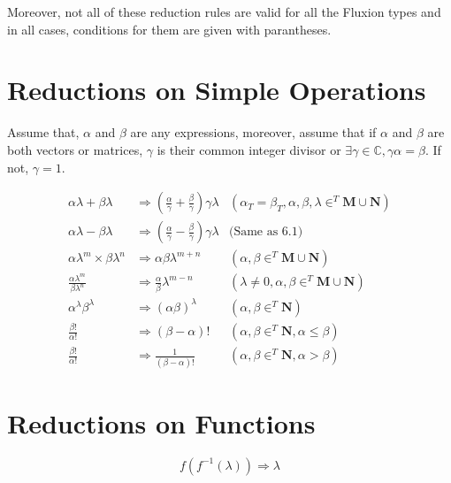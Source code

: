 \documentclass[11pt,a4paper]{book}
\begin{document}
Moreover, not all of these reduction rules are valid for all the Fluxion types and in all cases, conditions for them are given with parantheses.

\section{Reductions on Simple Operations}

Assume that, $\alpha$ and $\beta$ are any expressions, moreover, assume that if $\alpha$ and $\beta$ are both vectors or matrices, $\gamma$ is their common integer divisor or $\exists \gamma \in \mathbb{C}, \gamma\alpha = \beta$. If not, $\gamma = 1$.


\begin{align}
\alpha\lambda + \beta\lambda &\Rightarrow \left( \frac{\alpha}{\gamma} + \frac{\beta}{\gamma}\right)\gamma\lambda & \left( \alpha_T = \beta_T, \alpha, \beta, \lambda \in^T \mathbf{M} \cup \mathbf{N} \right)\\
\alpha\lambda - \beta\lambda &\Rightarrow \left( \frac{\alpha}{\gamma} - \frac{\beta}{\gamma}\right) \gamma\lambda & \text{(Same as 6.1)}\\
\alpha\lambda^m \times \beta\lambda^n &\Rightarrow  \alpha\beta\lambda^{m + n} & \left( \alpha, \beta \in^T \mathbf{M} \cup \mathbf{N} \right)\\
\frac{\alpha\lambda^{m}}{\beta\lambda^{n}} &\Rightarrow \frac{ \alpha}{\beta}\lambda^{m - n} & \left(\lambda \neq 0, \alpha, \beta \in^T \mathbf{M} \cup \mathbf{N} \right)\\
\alpha^{\lambda}\beta^{\lambda} &\Rightarrow \left(\alpha\beta\right)^\lambda & \left( \alpha, \beta \in^T \mathbf{N} \right)\\
\frac{\beta!}{\alpha!} &\Rightarrow \left(\beta - \alpha\right)! & \left( \alpha, \beta \in^T \mathbf{N}, \alpha \leq \beta \right)\\
\frac{\beta!}{\alpha!} &\Rightarrow \frac{1}{\left(\beta - \alpha\right)!} & \left( \alpha, \beta \in^T \mathbf{N}, \alpha > \beta \right)
\end{align}

\section{Reductions on Functions}

\begin{equation}
f(f^{-1}(\lambda)) \Rightarrow \lambda
\end{equation}
\end{document}
